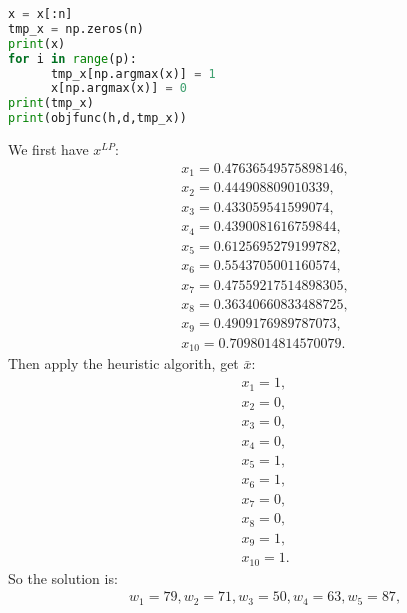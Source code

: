 \documentclass[12pt]{article}
\begin{document}
\begin{enumerate}
\begin{enumerate}
\begin{lstlisting}[language=Python]
x = x[:n]
tmp_x = np.zeros(n)
print(x)
for i in range(p):
      tmp_x[np.argmax(x)] = 1
      x[np.argmax(x)] = 0
print(tmp_x)
print(objfunc(h,d,tmp_x))
                        \end{lstlisting}
                        We first have $x^{LP}$:
                        \begin{align*}
                              &x_{1} = 0.47636549575898146,\\ 
                              &x_{2} = 0.444908809010339,\\ 
                              &x_{3} = 0.433059541599074,\\ 
                              &x_{4} = 0.4390081616759844,\\ 
                              &x_{5} = 0.6125695279199782,\\ 
                              &x_{6} = 0.5543705001160574,\\ 
                              &x_{7} = 0.47559217514898305,\\ 
                              &x_{8} = 0.36340660833488725,\\ 
                              &x_{9} = 0.4909176989787073,\\ 
                              &x_{10} = 0.7098014814570079.
                        \end{align*}
                        Then apply the heuristic algorith, get
                        $\bar{x}$:
                        \begin{align*}
                              &x_1 = 1,\\
                              &x_2 = 0,\\
                              &x_3 = 0,\\
                              &x_4 = 0,\\
                              &x_5 = 1,\\
                              &x_6 = 1,\\
                              &x_7 = 0,\\
                              &x_8 = 0,\\
                              &x_9 = 1,\\
                              &x_{10} = 1.
                        \end{align*}
                        So the solution is:
                        \begin{align*}
                              &w_{1} = 79, w_{2} = 71, w_{3} = 50, w_{4} = 63, w_{5} = 87,\\ 

\end{align*}
\end{enumerate}
\end{enumerate}
\end{document}
